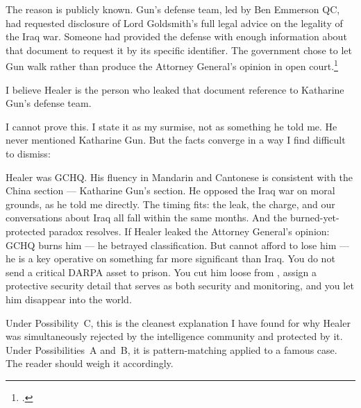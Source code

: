 The reason is publicly known. Gun's defense team, led by Ben Emmerson QC, had requested disclosure of  Lord Goldsmith's full legal advice on the legality of the Iraq war. Someone had provided the defense with enough information about that document to request it by its specific identifier. The government chose to let Gun walk rather than produce the Attorney General's opinion in open court.\footcite{norton-taylor2004}

I believe Healer is the person who leaked that document reference to Katharine Gun's defense team.

I cannot prove this. I state it as my surmise, not as something he told me. He never mentioned Katharine Gun. But the facts converge in a way I find difficult to dismiss:

Healer was GCHQ. His fluency in Mandarin and Cantonese is consistent with the China section --- Katharine Gun's section. He opposed the Iraq war on moral grounds, as he told me directly. The timing fits: the leak, the charge, and our conversations about Iraq all fall within the same months. And the burned-yet-protected paradox resolves. If Healer leaked the Attorney General's opinion: GCHQ burns him --- he betrayed classification. But  cannot afford to lose him --- he is a key operative on something far more significant than Iraq. You do not send a critical DARPA asset to prison. You cut him loose from , assign a protective security detail that serves as both security and monitoring, and you let him disappear into the world.

Under Possibility~C, this is the cleanest explanation I have found for why Healer was simultaneously rejected by the intelligence community and protected by it. Under Possibilities~A and~B, it is pattern-matching applied to a famous case. The reader should weigh it accordingly.

\chapterreturn
